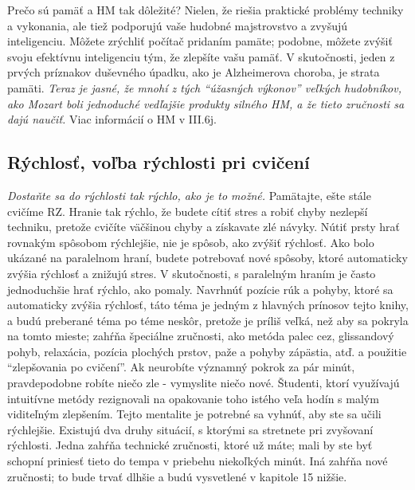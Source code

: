 Prečo sú pamäť a HM tak dôležité? Nielen, že riešia praktické problémy techniky a vykonania, ale tiež podporujú vaše hudobné majstrovstvo a zvyšujú inteligenciu. Môžete zrýchliť počítač pridaním pamäte; podobne, môžete zvýšiť svoju efektívnu inteligenciu tým, že zlepšíte vašu pamäť. V skutočnosti, jeden z prvých príznakov duševného úpadku, ako je Alzheimerova choroba, je strata pamäti. \emph{Teraz je jasné, že mnohí z tých “úžasných výkonov” veľkých hudobníkov, ako Mozart boli jednoduché vedľajšie produkty silného HM, a že tieto zručnosti sa dajú naučiť.} Viac informácií o HM v III.6j.

\subsection{Rýchlosť, voľba rýchlosti pri cvičení}

\emph{Dostaňte sa do rýchlosti tak rýchlo, ako je to možné.} Pamätajte, ešte stále cvičíme RZ. Hranie tak rýchlo, že budete cítiť stres a robiť chyby nezlepší techniku, pretože cvičíte väčšinou chyby a získavate zlé návyky. Nútiť prsty hrať rovnakým spôsobom rýchlejšie, nie je spôsob, ako zvýšiť rýchlosť. Ako bolo ukázané na paralelnom hraní, budete potrebovať nové spôsoby, ktoré automaticky zvýšia rýchlosť a znižujú stres. V skutočnosti, s paralelným hraním je často jednoduchšie hrať rýchlo, ako pomaly. Navrhnúť pozície rúk a pohyby, ktoré sa automaticky zvýšia rýchlosť, táto téma je jedným z hlavných prínosov tejto knihy, a budú preberané téma po téme neskôr, pretože je príliš veľká, než aby sa pokryla na tomto mieste; zahŕňa špeciálne zručnosti, ako metóda palec cez, glissandový pohyb, relaxácia, pozícia plochých prstov, paže a pohyby zápästia, atď. a použitie “zlepšovania po cvičení”. Ak neurobíte významný pokrok za pár minút, pravdepodobne robíte niečo zle -  vymyslite niečo nové. Študenti, ktorí využívajú intuitívne metódy rezignovali na opakovanie toho istého veľa hodín s malým viditeľným zlepšením. Tejto mentalite je potrebné sa vyhnúť, aby ste sa učili rýchlejšie. Existujú dva druhy situácií, s ktorými sa stretnete pri zvyšovaní rýchlosti. Jedna zahŕňa technické zručnosti, ktoré už máte; mali by ste byť schopní priniesť tieto do tempa v priebehu niekoľkých minút. Iná zahŕňa nové zručnosti; to bude trvať dlhšie a budú vysvetlené v kapitole 15 nižšie.

